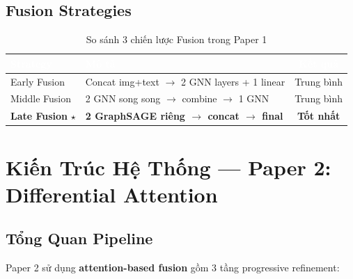 \documentclass[12pt,a4paper]{article}
\begin{document}
\subsection{Fusion Strategies}

\begin{table}[H]
\centering
\caption{So sánh 3 chiến lược Fusion trong Paper 1}
\begin{tabular}{llc}
\toprule
\rowcolor{tableheader}
\textcolor{white}{\textbf{Strategy}} & \textcolor{white}{\textbf{Mô tả}} & \textcolor{white}{\textbf{Kết quả}} \\
\midrule
Early Fusion & Concat img+text $\rightarrow$ 2 GNN layers + 1 linear & Trung bình \\
Middle Fusion & 2 GNN song song $\rightarrow$ combine $\rightarrow$ 1 GNN & Trung bình \\
\textbf{Late Fusion} $\star$ & \textbf{2 GraphSAGE riêng $\rightarrow$ concat $\rightarrow$ final} & \textbf{Tốt nhất} \\
\bottomrule
\end{tabular}
\end{table}

\section{Kiến Trúc Hệ Thống — Paper 2: Differential Attention}

\subsection{Tổng Quan Pipeline}

Paper 2 sử dụng \textbf{attention-based fusion} gồm 3 tầng progressive refinement:
\end{document}
